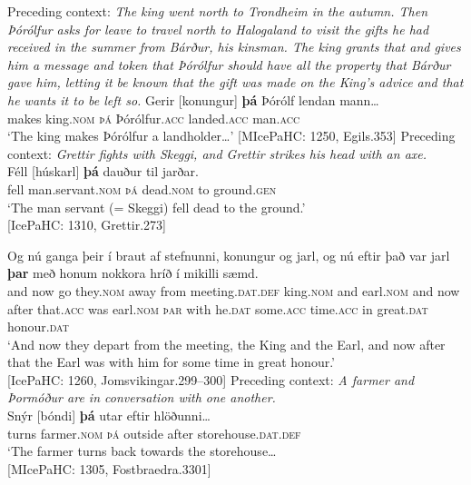\documentclass[output=paper,colorlinks,citecolor=brown]{langscibook}
\begin{document}
\ea \label{subj-occup}
\ea \label{occup-cont} %
    Preceding context: \textit{The king went north to Trondheim in the autumn. Then Þórólfur asks for leave to travel north to Halogaland to visit the gifts he had received in the summer from Bárður, his kinsman. The king grants that and gives him a message and token that Þórólfur should have all the property that Bárður gave him, letting it be known that the gift was made on the King's advice and that he wants it to be left so.}
    \gll Gerir [konungur] \textbf{þá} Þórólf lendan mann\dots\\
    makes king.\textsc{nom} \textsc{þá} Þórólfur.\textsc{acc} landed.\textsc{acc} man.\textsc{acc}\\
    \glt `The king makes Þórólfur a landholder\dots' \hfill [MIcePaHC: 1250, Egils.353]
\ex \label{occup-shift}
    Preceding context: \textit{Grettir fights with Skeggi, and Grettir strikes his head with an axe.}\\
    \gll Féll [húskarl] \textbf{þá} dauður til jarðar.\\
    fell man.servant.\textsc{nom} \textsc{þá} dead.\textsc{nom} to ground.\textsc{gen}\\
    \glt `The man servant (= Skeggi) fell dead to the ground.'\\ \hfill [IcePaHC: 1310, Grettir.273]
\z 
\z

\ea \label{occup-subsect}
\ea  
    \gll Og nú ganga þeir {í braut} af stefnunni, konungur og jarl, og nú eftir það var jarl \textbf{þar} með honum nokkora hríð í mikilli sæmd.\\
    and now go they.\textsc{nom} away from meeting.\textsc{dat.def} king.\textsc{nom} and earl.\textsc{nom} and now after that.\textsc{acc} was earl.\textsc{nom} \textsc{þar} with he.\textsc{dat} some.\textsc{acc} time.\textsc{acc} in great.\textsc{dat} honour.\textsc{dat}\\
    \glt `And now they depart from the meeting, the King and the Earl, and now after that the Earl was with him for some time in great honour.'\\ \hfill [IcePaHC: 1260, Jomsvikingar.299--300]
\clearpage
\ex  
    Preceding context: \textit{A farmer and Þormóður are in conversation with one another.}\\
    \gll Snýr [bóndi] \textbf{þá} utar eftir hlöðunni\dots\\
    turns farmer.\textsc{nom} \textsc{þá} outside after storehouse.\textsc{dat.def}\\
    \glt `The farmer turns back towards the storehouse\dots \\ \hfill [MIcePaHC: 1305, Fostbraedra.3301]
\z 
\z 
\end{document}
